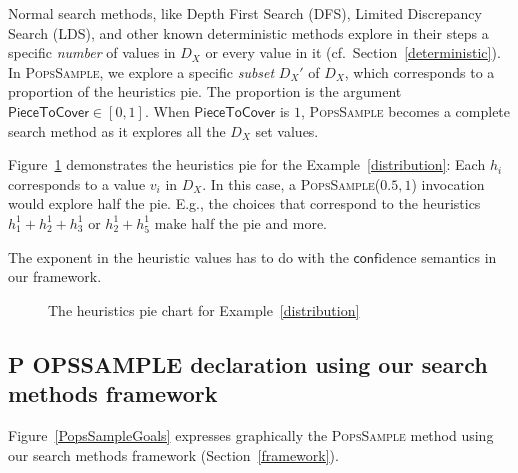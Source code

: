 \documentclass{ws-ijait}
\begin{document}
Normal search methods, like Depth First Search (DFS),
Limited Discrepancy Search (LDS), and other known
deterministic methods explore in their steps a specific
\emph{number} of values in $D_X$ or every value in it (cf.\ 
Section~\ref{deterministic}). In \textsc{PopsSample}, we
explore a specific \emph{subset} $D_X'$ of $D_X$, which
corresponds to a proportion of the heuristics pie. The
proportion is the argument $\mathsf{PieceToCover} \in
[0,1]$. When $\mathsf{PieceToCover}$ is $1$,
\textsc{PopsSample} becomes a complete search method as it
explores all the $D_X$ set values.
\begin{example}
  Figure~\ref{piechart} demonstrates the heuristics pie for
  the Example~\ref{distribution}: Each $h_i$ corresponds to
  a value $v_i$ in $D_X$. In this case, a
  \textsc{PopsSample}($0.5, 1$) invocation would explore
  half the pie. E.g., the choices that correspond to the
  heuristics $h_1^1 + h_2^1 + h_3^1$ or $h_2^1 + h_5^1$ make
  half the pie and more.
\end{example}
The exponent in the heuristic values has to do with the
$\mathsf{conf}$idence semantics in our framework.

\begin{figure}
  \centering
  
  \caption{The heuristics pie chart for
           Example~\ref{distribution}\label{piechart}}
\end{figure}

\newcommand{\PoPS}{\textbf{\normalsize P\footnotesize
                           O\normalsize PS}}
\newcommand{\PopsSample}{\textbf{\normalsize P\footnotesize
                       OPS\normalsize S\footnotesize AMPLE}}

\subsection{\PopsSample{} declaration using our search
            methods framework}

Figure~\ref{PopsSampleGoals} expresses graphically the
\textsc{PopsSample} method using our search methods
framework (Section~\ref{framework}).
\end{document}
